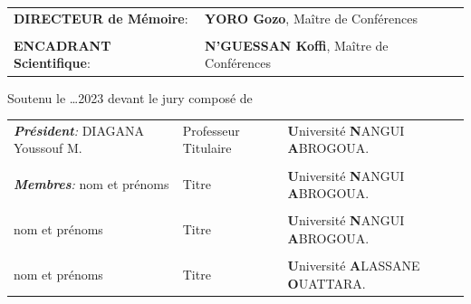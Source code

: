\begin{spacing}{0.85}
	\begin{center}
		\begin{tabular}{ll}
			\textbf{DIRECTEUR de Mémoire}:  &  \textbf{YORO Gozo}, Maître de Conférences \\
			\\
			\textbf{ENCADRANT Scientifique}: &  \textbf{ \textbf{N'GUESSAN Koffi}}, Maître de Conférences
		\end{tabular}
	\end{center}
	\begin{center}
		Soutenu le \ldots 2023 devant le jury composé de
		\\
		
	\end{center}
	\begin{tabular}{lll}
		\hline \hline
		\emph{\textbf{Président}:}  DIAGANA Youssouf M. & Professeur Titulaire & \textbf{U}niversité \textbf{N}ANGUI \textbf{A}BROGOUA.\\
		\\
		\emph{\textbf{Membres}:}    nom et prénoms & Titre & \textbf{U}niversité \textbf{N}ANGUI \textbf{A}BROGOUA.\\
		\\
		\qquad \qquad \quad  nom et prénoms & Titre & \textbf{U}niversité \textbf{N}ANGUI \textbf{A}BROGOUA.\\
		\\
		\qquad \qquad  \quad    nom et prénoms & Titre & \textbf{U}niversité \textbf{A}LASSANE \textbf{O}UATTARA.\\
		\hline \hline
	\end{tabular}
\end{spacing}

\frontmatter
\tableofcontents